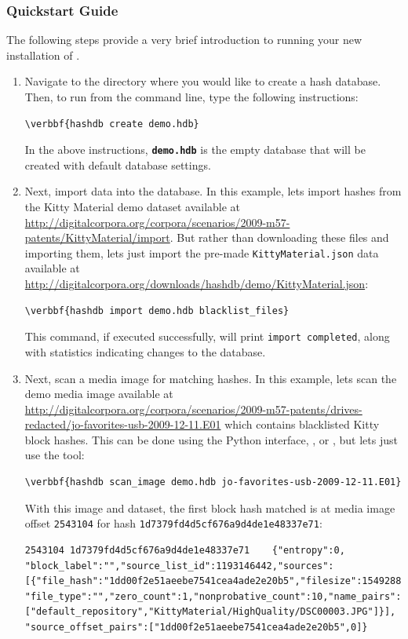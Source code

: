 \documentclass[11pt,fleqn]{article} %
\begin{document}
\subsubsection{Quickstart Guide}
The following steps provide a very brief introduction to running your new installation of \hdb. 
\begin{enumerate}
\item Navigate to the directory where you would like to create a hash database. Then, to run \hdb from the command line, type the following instructions: 
\begin{Verbatim}[commandchars=\\\{\}]
\verbbf{hashdb create demo.hdb}
\end{Verbatim} 

In the above instructions, \texttt{\textbf{demo.hdb}} is the empty database that will be created with default database settings.

\item Next, import data into the database. In this example, lets import hashes from the Kitty Material demo dataset available at \url{http://digitalcorpora.org/corpora/scenarios/2009-m57-patents/KittyMaterial/import}. But rather than downloading these files and importing them, lets just import the pre-made \verb+KittyMaterial.json+ data available at \url{http://digitalcorpora.org/downloads/hashdb/demo/KittyMaterial.json}:
\begin{Verbatim}[commandchars=\\\{\}]
\verbbf{hashdb import demo.hdb blacklist_files}
\end{Verbatim} 
This command, if executed successfully, will print \verb+import completed+, along with statistics indicating changes to the database.

\item Next, scan a media image for matching hashes. In this example, lets scan the demo media image available at \url{ http://digitalcorpora.org/corpora/scenarios/2009-m57-patents/drives-redacted/jo-favorites-usb-2009-12-11.E01} which contains blacklisted Kitty block hashes. This can be done using the Python interface, \sscope, or \bulk, but lets just use the \hdb tool:
\begin{Verbatim}[commandchars=\\\{\}]
\verbbf{hashdb scan_image demo.hdb jo-favorites-usb-2009-12-11.E01}
\end{Verbatim} 
With this image and dataset, the first block hash matched is at media image offset \verb+2543104+ for hash \verb+1d7379fd4d5cf676a9d4de1e48337e71+:

\begingroup
\footnotesize
\begin{Verbatim}[fontfamily=courier]
2543104	1d7379fd4d5cf676a9d4de1e48337e71	{"entropy":0,
"block_label":"","source_list_id":1193146442,"sources":
[{"file_hash":"1dd00f2e51aeebe7541cea4ade2e20b5","filesize":1549288,
"file_type":"","zero_count":1,"nonprobative_count":10,"name_pairs":
["default_repository","KittyMaterial/HighQuality/DSC00003.JPG"]}],
"source_offset_pairs":["1dd00f2e51aeebe7541cea4ade2e20b5",0]}
\end{Verbatim}
\endgroup

\end{enumerate}
\end{document}
